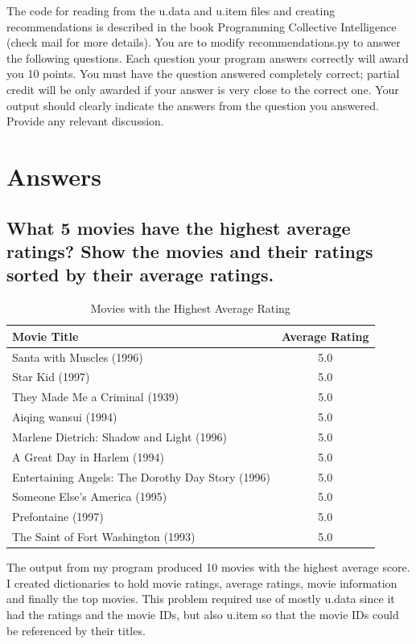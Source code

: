 \documentclass{article}
\begin{document}
The code for reading from the u.data and u.item files and creating recommendations is described in the book Programming Collective Intelligence (check mail for more details). You are to modify recommendations.py to answer the following questions. Each question your program answers correctly will award you 10 points. You must have the question answered completely correct; partial credit will be only awarded if your answer is very close to the correct one. Your output should clearly indicate the answers from the question you answered. Provide any relevant discussion.



\newpage
\section*{Answers}
\renewcommand\thesubsection{\arabic{subsection}}
\subsection{What 5 movies have the highest average ratings? Show the movies and their ratings sorted by their average ratings.}

\begin{table}[!h]
\centering
\begin{tabular}{l c}
Movie Title & Average Rating \\
\hline
Santa with Muscles (1996) & 5.0  \\
Star Kid (1997) & 5.0  \\
They Made Me a Criminal (1939) & 5.0  \\
Aiqing wansui (1994) & 5.0  \\
Marlene Dietrich: Shadow and Light (1996) & 5.0  \\
A Great Day in Harlem (1994) & 5.0  \\
Entertaining Angels: The Dorothy Day Story (1996) & 5.0  \\
Someone Else's America (1995) & 5.0  \\
Prefontaine (1997) & 5.0  \\
The Saint of Fort Washington (1993) & 5.0  \\
\hline
\end{tabular}
\caption{Movies with the Highest Average Rating}
\end{table}

The output from my program produced 10 movies with the highest average score. I created dictionaries to hold movie ratings, average ratings, movie information and finally the top movies. This problem required use of mostly u.data since it had the ratings and the movie IDs, but also u.item so that the movie IDs could be referenced by their titles.
\end{document}
